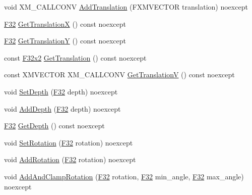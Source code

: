\begin{DoxyCompactItemize}
void X\+M\+\_\+\+C\+A\+L\+L\+C\+O\+NV \mbox{\hyperlink{classmage_1_1_sprite_transform_a38ce964e75aca33eac312a995d142495}{Add\+Translation}} (F\+X\+M\+V\+E\+C\+T\+OR translation) noexcept
\item 
\mbox{\hyperlink{namespacemage_aa97e833b45f06d60a0a9c4fc22ae02c0}{F32}} \mbox{\hyperlink{classmage_1_1_sprite_transform_a27f93a491eed09c33f1ac547df011867}{Get\+TranslationX}} () const noexcept
\item 
\mbox{\hyperlink{namespacemage_aa97e833b45f06d60a0a9c4fc22ae02c0}{F32}} \mbox{\hyperlink{classmage_1_1_sprite_transform_a45ac68b47fb751b8c3908524177c37c8}{Get\+TranslationY}} () const noexcept
\item 
const \mbox{\hyperlink{namespacemage_a9dc0d34d6ecc87e4cfa4a826102117bc}{F32x2}} \mbox{\hyperlink{classmage_1_1_sprite_transform_a89022e79bd08b6efeb6f660a0da782f0}{Get\+Translation}} () const noexcept
\item 
const X\+M\+V\+E\+C\+T\+OR X\+M\+\_\+\+C\+A\+L\+L\+C\+O\+NV \mbox{\hyperlink{classmage_1_1_sprite_transform_af3b66de480287ea042b84557aadd6be1}{Get\+TranslationV}} () const noexcept
\item 
void \mbox{\hyperlink{classmage_1_1_sprite_transform_a99da2aa3c134db3f4a72660befe1ca9a}{Set\+Depth}} (\mbox{\hyperlink{namespacemage_aa97e833b45f06d60a0a9c4fc22ae02c0}{F32}} depth) noexcept
\item 
void \mbox{\hyperlink{classmage_1_1_sprite_transform_a38ba3e38c4397f536e7c1998ef91d3d0}{Add\+Depth}} (\mbox{\hyperlink{namespacemage_aa97e833b45f06d60a0a9c4fc22ae02c0}{F32}} depth) noexcept
\item 
\mbox{\hyperlink{namespacemage_aa97e833b45f06d60a0a9c4fc22ae02c0}{F32}} \mbox{\hyperlink{classmage_1_1_sprite_transform_acbb61149d34be717c43a78fc9113fe9c}{Get\+Depth}} () const noexcept
\item 
void \mbox{\hyperlink{classmage_1_1_sprite_transform_aa5e9162146729dd579e2409e348eafa2}{Set\+Rotation}} (\mbox{\hyperlink{namespacemage_aa97e833b45f06d60a0a9c4fc22ae02c0}{F32}} rotation) noexcept
\item 
void \mbox{\hyperlink{classmage_1_1_sprite_transform_ab189a29372631e74ae5f638243eaa312}{Add\+Rotation}} (\mbox{\hyperlink{namespacemage_aa97e833b45f06d60a0a9c4fc22ae02c0}{F32}} rotation) noexcept
\item 
void \mbox{\hyperlink{classmage_1_1_sprite_transform_a29d41f069bb02f46bae495d1e9a19c9b}{Add\+And\+Clamp\+Rotation}} (\mbox{\hyperlink{namespacemage_aa97e833b45f06d60a0a9c4fc22ae02c0}{F32}} rotation, \mbox{\hyperlink{namespacemage_aa97e833b45f06d60a0a9c4fc22ae02c0}{F32}} min\+\_\+angle, \mbox{\hyperlink{namespacemage_aa97e833b45f06d60a0a9c4fc22ae02c0}{F32}} max\+\_\+angle) noexcept

\end{DoxyCompactItemize}

